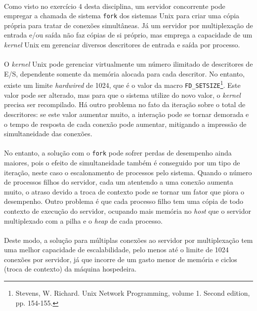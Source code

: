 \documentclass[a4paper,10pt,oneside,final,titlepage,onecolumn]{article}
\begin{document}
\paragraph{}Como visto no exercício 4 desta disciplina, um servidor concorrente pode empregar a chamada de sistema \verb|fork| dos sistemas Unix para criar uma cópia própria para tratar de conexões simultâneas. Já um servidor por multiplexação de entrada e/ou saída não faz cópias de si próprio, mas emprega a capacidade de um \emph{kernel} Unix em gerenciar diversos descritores de entrada e saída por processo.
\paragraph{}O \emph{kernel} Unix pode gerenciar virtualmente um número ilimitado de descritores de E/S, dependente somente da memória alocada para cada descritor. No entanto, existe um limite \emph{hardwired} de 1024, que é o valor da macro \verb|FD_SETSIZE|\footnote{Stevens, W. Richard. Unix Network Programming, volume 1. Second edition, pp. 154-155.}. Este valor pode ser alterado, mas para que o sistema utilize do novo valor, o \emph{kernel} precisa ser recompilado. Há outro problema no fato da iteração sobre o total de descritores: se este valor aumentar muito, a interação pode se tornar demorada e o tempo de resposta de cada conexão pode aumentar, mitigando a impressão de simultaneidade das conexões.
\paragraph{}No entanto, a solução com o \verb|fork| pode sofrer perdas de desempenho ainda maiores, pois o efeito de simultaneidade também é conseguido por um tipo de iteração, neste caso o escalonamento de processos pelo sistema. Quando o número de processos filhos do servidor, cada um atentendo a uma conexão aumenta muito, o atraso devido a troca de contexto pode se tornar um fator que piora o desempenho. Outro problema é que cada processo filho tem uma cópia de todo contexto de execução do servidor, ocupando mais memória no \emph{host} que o servidor multiplexado com a pilha e o \emph{heap} de cada processo.
\paragraph{}Deste modo, a solução para múltiplas conexões ao servidor por multiplexação tem uma melhor capacidade de escalabilidade, pelo menos até o limite de 1024 conexões por servidor, já que incorre de um gasto menor de memória e ciclos (troca de contexto) da máquina hospedeira.
\end{document}
